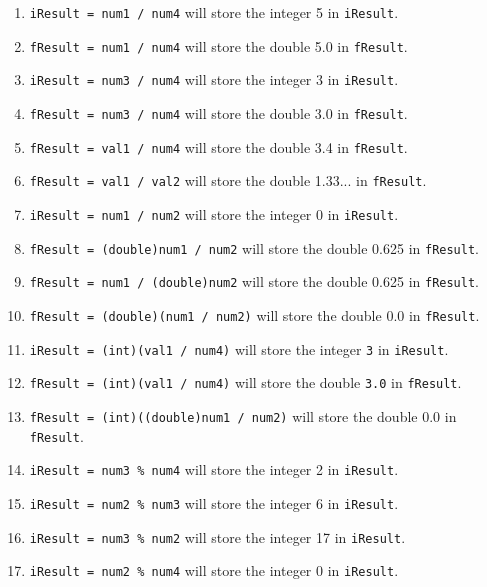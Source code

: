 \documentclass[leqno, 11pt]{article}
\begin{document}
\begin{enumerate}[label=\alph*.]
  \item \texttt{iResult = num1 / num4} will store the integer 5 in \texttt{iResult}.
  \item \texttt{fResult = num1 / num4} will store the double 5.0 in \texttt{fResult}.
  \item \texttt{iResult = num3 / num4} will store the integer 3 in \texttt{iResult}.
  \item \texttt{fResult = num3 / num4} will store the double 3.0 in \texttt{fResult}.
  \item \texttt{fResult = val1 / num4} will store the double 3.4 in \texttt{fResult}.
  \item \texttt{fResult = val1 / val2} will store the double 1.33... in \texttt{fResult}.
  \item \texttt{iResult = num1 / num2} will store the integer 0 in \texttt{iResult}.
  \item \texttt{fResult = (double)num1 / num2} will store the double 0.625 in \texttt{fResult}.
  \item \texttt{fResult = num1 / (double)num2} will store the double 0.625 in \texttt{fResult}.
  \item \texttt{fResult = (double)(num1 / num2)} will store the double 0.0 in \texttt{fResult}.
  \item \texttt{iResult = (int)(val1 / num4)} will store the integer \texttt{3} in \texttt{iResult}.
  \item \texttt{fResult = (int)(val1 / num4)} will store the double \texttt{3.0} in \texttt{fResult}.
  \item \texttt{fResult = (int)((double)num1 / num2)} will store the double 0.0 in \texttt{fResult}.
  \item \texttt{iResult = num3 \% num4} will store the integer 2 in \texttt{iResult}.
  \item \texttt{iResult = num2 \% num3} will store the integer 6 in \texttt{iResult}.
  \item \texttt{iResult = num3 \% num2} will store the integer 17 in \texttt{iResult}.
  \item \texttt{iResult = num2 \% num4} will store the integer 0 in \texttt{iResult}.
\end{enumerate}
\end{document}
